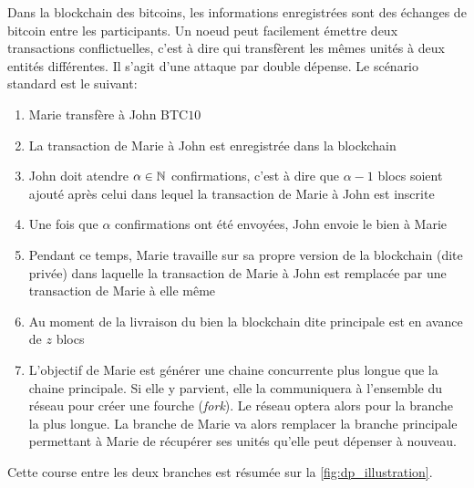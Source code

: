 Dans la blockchain des bitcoins, les informations enregistrées sont des échanges de bitcoin entre les participants. Un noeud peut facilement émettre deux transactions conflictuelles, c'est à dire qui transfèrent les mêmes unités à deux entités différentes. Il s'agit d'une attaque par double dépense. Le scénario standard est le suivant:
\begin{enumerate}
    \item Marie transfère à John BTC$10$
    \item La transaction de Marie à John est enregistrée dans la blockchain
    \item John doit atendre $\alpha\in\mathbb{N}$ confirmations, c'est à dire que $\alpha-1$ blocs soient ajouté après celui dans lequel la transaction de Marie à John est inscrite
    \item Une fois que $\alpha$ confirmations ont été envoyées, John envoie le bien à Marie
    \item Pendant ce temps, Marie travaille sur sa propre version de la blockchain (dite privée) dans laquelle la transaction de Marie à John est remplacée par une transaction de Marie à elle même
    \item Au moment de la livraison du bien la blockchain dite principale est en avance de $z$ blocs 
    \item L'objectif de Marie est générer une chaine concurrente plus longue que la chaine principale. Si elle y parvient, elle la communiquera à l'ensemble du réseau pour créer une fourche (\textit{fork}). Le réseau optera alors pour la branche la plus longue.
    La branche de Marie va alors remplacer la branche principale permettant à Marie de récupérer ses unités qu'elle peut dépenser à nouveau. 
\end{enumerate}
Cette course entre les deux branches est résumée sur la \cref{fig:dp_illustration}.

